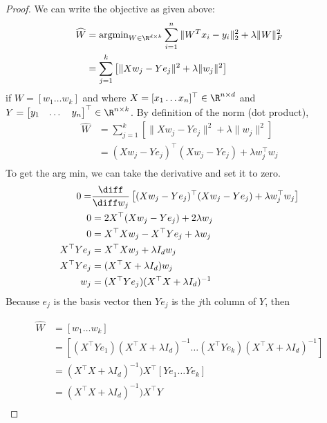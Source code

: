 \documentclass[shortlabels]{article}
\begin{document}
\begin{aprob}
\begin{enumerate}
        \begin{proof}
            We can write the objective as given above: 
            \begin{align*}
                \widehat{W} &= \text{argmin}_{W \in \R^{d \times k}} \sum_{i=1}^{n} \| W^Tx_{i} - y_{i} \|^{2}_{2} + \lambda \|W\|_{F}^{2} \\
                &= \sum_{j=1}^k \left[  \| X w_j - Y e_j\|^2 + \lambda \| w_j \|^2 \right]
            \end{align*}
            if $W = [w_1 \dots w_k]$ and where $X = [x_1 \dots x_n]^\top \in \R^{n \times d}$ and $Y = \begin{bmatrix} y_1 & \dots & y_n \end{bmatrix}^\top \in \R^{n \times k}$. By definition of the norm (dot product),
            \begin{align*}
                \widehat{W} &= \sum_{j=1}^k \left[  \| X w_j - Y e_j\|^2 + \lambda \| w_j \|^2 \right] \\
                &= (X w_j - Y e_j)^\top (X w_j - Y e_j) + \lambda w_j^\top w_j \\
            \end{align*}
            To get the arg min, we can take the derivative and set it to zero.
            \begin{align*}
                0 =& \frac{\diff}{\diff w_j} \left[ (X w_j - Y e_j)^\top (X w_j - Y e_j) + \lambda w_j^\top w_j \right] \\
                0 &= 2X^\top (X w_j - Y e_j) + 2 \lambda w_j \\
                0 &= X^\top X w_j - X^\top Y e_j + \lambda w_j \\
                X^\top Y e_j &= X^\top X w_j + \lambda I_d w_j \\
                X^\top Y e_j &= (X^\top X + \lambda I_d) w_j \\
                w_j &= (X^\top Y e_j)(X^\top X + \lambda I_d)^{-1}\\
            \end{align*}
            Because $e_j$ is the basis vector then $Y e_j$ is the $j$th column of $Y$, then 

            \begin{align*}
                \widehat{W} &= [ w_1 \dots w_k ] \\
                &=  [(X^\top Y e_1)(X^\top X + \lambda I_d)^{-1} \dots (X^\top Y e_k)(X^\top X + \lambda I_d)^{-1}] \\
                &=  (X^\top X + \lambda I_d)^{-1}) X^\top [Y e_1  \dots Y e_k] \\
                &=  (X^\top X + \lambda I_d)^{-1}) X^\top Y \\
            \end{align*}
        \end{proof}


\end{enumerate}
\end{aprob}
\end{document}
